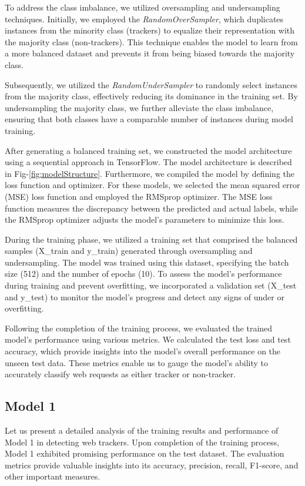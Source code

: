 To address the class imbalance, we utilized oversampling and undersampling techniques. Initially, we employed the \emph{RandomOverSampler},
which duplicates instances from the minority class (trackers) to equalize their representation with the majority class (non-trackers).
This technique enables the model to learn from a more balanced dataset and prevents it from being biased towards the majority class.

Subsequently, we utilized the \emph{RandomUnderSampler} to randomly select instances from the majority class, effectively reducing its
dominance in the training set. By undersampling the majority class, we further alleviate the class imbalance, ensuring that both
classes have a comparable number of instances during model training.

After generating a balanced training set, we constructed the model architecture using a sequential approach in TensorFlow.
The model architecture is described in Fig-\ref{fig:modelStructure}.
Furthermore, we compiled the model by defining the loss function and optimizer. For these models, we selected the mean squared
error (MSE) loss function and employed the RMSprop optimizer. The MSE loss function measures the discrepancy between the predicted
and actual labels, while the RMSprop optimizer adjusts the model's parameters to minimize this loss.

During the training phase, we utilized a training set that comprised the balanced samples (X\_train and y\_train) generated
through oversampling and undersampling. The model was trained using this dataset, specifying the batch size (512) and the number
of epochs (10). To assess the model's performance during training and prevent overfitting, we incorporated a validation set
(X\_test and y\_test) to monitor the model's progress and detect any signs of under or overfitting.

Following the completion of the training process, we evaluated the trained model's performance using various metrics.
We calculated the test loss and test accuracy, which provide insights into the model's overall performance on the unseen
test data. These metrics enable us to gauge the model's ability to accurately classify web requests as either tracker
or non-tracker.

\subsection{Model 1}

Let us present a detailed analysis of the training results and performance of Model 1 in detecting web trackers. Upon completion of
the training process, Model 1 exhibited promising performance on the test dataset. The evaluation metrics provide valuable insights
into its accuracy, precision, recall, F1-score, and other important measures.


